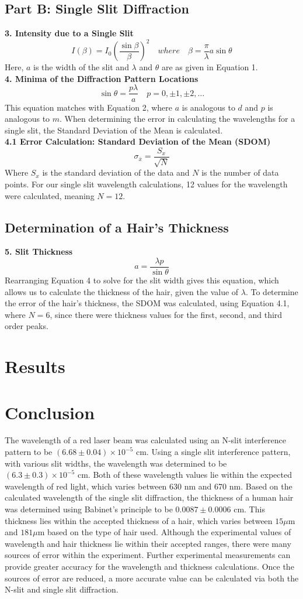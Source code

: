 \documentclass[12pt]{article}
\begin{document}
\subsection*{Part B: Single Slit Diffraction}
    \noindent\textbf{3. Intensity due to a Single Slit}\[I(\beta)=I_0\left(\frac{\sin\beta}{\beta}\right)^2\quad where \quad \beta=\frac{\pi}{\lambda}a\sin\theta\]
    Here, $a$ is the width of the slit and $\lambda$ and $\theta$ are as given in Equation 1.\\
\textbf{4. Minima of the Diffraction Pattern Locations} \[\sin\theta=\frac{p\lambda}{a} \quad p=0,\pm1,\pm2,\dots\]
This equation matches with Equation 2, where $a$ is analogous to $d$ and $p$ is analogous to $m$. When determining the error in calculating the wavelengths for a single slit, the Standard Deviation of the Mean is calculated.\\    
\textbf{4.1 Error Calculation: Standard Deviation of the Mean (SDOM)}\[\sigma_{\bar{x}}=\frac{S_x}{\sqrt{N}}\]
    Where $S_x$ is the standard deviation of the data and $N$ is the number of data points. For our single slit wavelength calculations, 12 values for the wavelength were calculated, meaning $N=12$.
\subsection*{Determination of a Hair's Thickness}
\noindent\textbf{5. Slit Thickness}\[a=\frac{\lambda p}{\sin\theta}\]
Rearranging Equation 4 to solve for the slit width gives this equation, which allows us to calculate the thickness of the hair, given the value of $\lambda$. 
To determine the error of the hair's thickness, the SDOM was calculated, using Equation 4.1, where $N=6$, since there were thickness values for the first, second, and third order peaks. 
\newpage
\section{Results}

\newpage
\section{Conclusion}
The wavelength of a red laser beam was calculated using an N-slit interference pattern to be  $(6.68\pm0.04)\times10^{-5}$ cm. 
Using a single slit interference pattern, with various slit widths, the wavelength was determined to be $(6.3\pm 0.3)\times10^{-5}$ cm.
Both of these wavelength values lie within the expected wavelength of red light, which varies between 630 nm and 670 nm.
Based on the calculated wavelength of the single slit diffraction, the thickness of a human hair was determined using Babinet's principle to be $0.0087 \pm 0.0006$ cm. 
This thickness lies within the accepted thickness of a hair, which varies between $15 \mu$m and $181 \mu$m based on the type of hair used.
Although the experimental values of wavelength and hair thickness lie within their accepted ranges, there were many sources of error within the experiment. 
Further experimental measurements can provide greater accuracy for the wavelength and thickness calculations.
Once the sources of error are reduced, a more accurate value can be calculated via both the N-slit and single slit diffraction. 
\newpage
\end{document}
